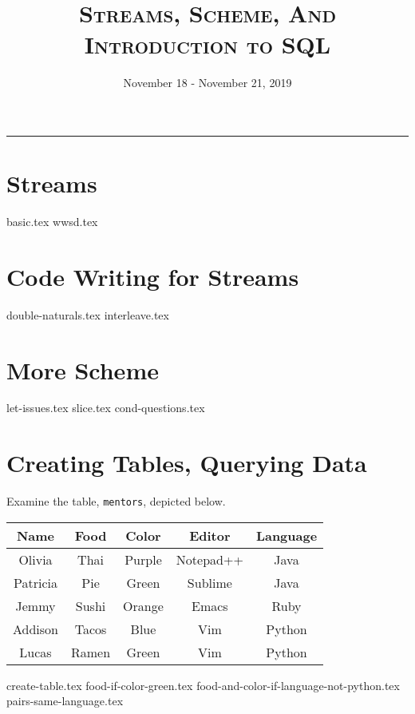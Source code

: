 \documentclass{exam}
\title{\textsc{Streams, Scheme, And Introduction to SQL}}
\date{November 18 - November 21, 2019}
\begin{document}
\maketitle\rule{\textwidth}{0.15em}
\fontsize{12}{15}\selectfont

\section{Streams}
\begin{questions}
{basic.tex}
\newpage
{wwsd.tex}
\end{questions}
\section{Code Writing for Streams}
\begin{questions}
{double-naturals.tex}
{interleave.tex}
\end{questions}

\section{More Scheme}
\begin{questions}
{let-issues.tex}
{slice.tex}
\newpage
{cond-questions.tex}
\end{questions}


\section{Creating Tables, Querying Data}
Examine the table, \texttt{mentors}, depicted below.

\begin{center}
\begin{tabular}{|c|c|c|c|c|}
 \hline
 \textbf{Name} & \textbf{Food} & \textbf{Color} & \textbf{Editor} & \textbf{Language} \\
 \hline
 Olivia & Thai & Purple & Notepad++ & Java \\
 \hline
 Patricia & Pie & Green & Sublime & Java \\
 \hline
 Jemmy & Sushi & Orange & Emacs & Ruby \\
 \hline
 Addison & Tacos & Blue & Vim & Python \\
 \hline
 Lucas & Ramen & Green & Vim & Python \\
 \hline
\end{tabular}
\end{center}

\begin{questions}
{create-table.tex}
\newpage
{food-if-color-green.tex}
{food-and-color-if-language-not-python.tex}
{pairs-same-language.tex}
\end{questions}
\end{document}
